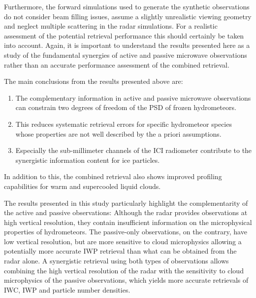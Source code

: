\documentclass[journal abbreviation, manuscript]{copernicus}
\begin{document}
Furthermore, the forward simulations used to generate the synthetic observations
do not consider beam filling issues, assume a slightly unrealistic viewing
geometry and neglect multiple scattering in the radar simulations. For a
realistic assessment of the potential retrieval performance this should
certainly be taken into account. Again, it is important to understand the
results presented here as a study of the fundamental synergies of active and
passive microwave observations rather than an accurate performance assessment of
the combined retrieval.

\conclusions  %
\label{sec:conclusions}

The main conclusions from the results presented above are:
\begin{enumerate}
\item The complementary information in active and passive microwave observations
  can constrain two degrees of freedom of the PSD of frozen hydrometeors.
\item This reduces systematic retrieval errors for specific hydrometeor species whose
  properties are not well described by the a priori assumptions.
\item Especially the sub-millimeter channels of the ICI radiometer contribute to
  the synergistic information content for ice particles.
\end{enumerate}

In addition to this, the combined retrieval also shows improved profiling capabilities
for warm and supercooled liquid clouds.

The results presented in this study particularly highlight the complementarity
of the active and passive observations: Although the radar provides observations
at high vertical resolution, they contain insufficient information on the
microphysical properties of hydrometeors. The passive-only observations, on the
contrary, have low vertical resolution, but are more sensitive to cloud
microphysics allowing a potentially more accurate IWP retrieval than what can be
obtained from the radar alone. A synergistic retrieval using both types of
observations allows combining the high vertical resolution of the radar with the
sensitivity to cloud microphysics of the passive observations, which
yields more accurate retrievals of IWC, IWP and particle number densities.
\end{document}
